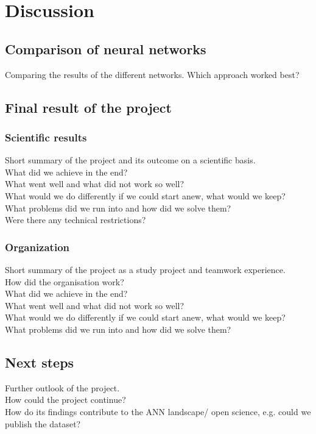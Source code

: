 \section{Discussion}

\subsection{Comparison of neural networks}

Comparing the results of the different networks. Which approach worked best?

\subsection{Final result of the project}


\subsubsection{Scientific results}

Short summary of the project and its outcome on a scientific basis. \\
What did we achieve in the end? \\
What went well and what did not work so well? \\
What would we do differently if we could start anew, what would we keep? \\
What problems did we run into and how did we solve them? \\
Were there any technical restrictions?

\subsubsection{Organization}

Short summary of the project as a study project and teamwork experience. \\
How did the organisation work? \\
What did we achieve in the end? \\
What went well and what did not work so well? \\
What would we do differently if we could start anew, what would we keep? \\
What problems did we run into and how did we solve them?

\subsection{Next steps}

Further outlook of the project. \\
How could the project continue? \\
How do its findings contribute to the ANN landscape/ open science, e.g. could we publish the dataset?


